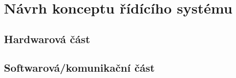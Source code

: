 \chapter{Návrh konceptu řídícího systému}


\section{Hardwarová část}


\section{Softwarová/komunikační část}